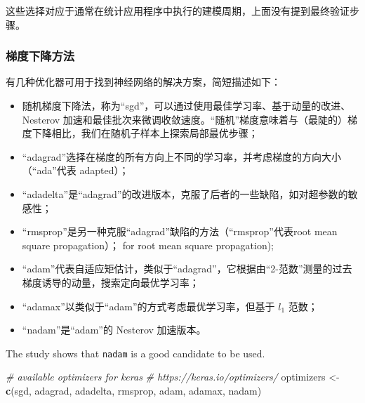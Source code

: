 \documentclass[
]{article}
\newenvironment{Shaded}{\begin{snugshade}}{\end{snugshade}}
\newcommand{\CommentTok}[1]{\textcolor[rgb]{0.56,0.35,0.01}{\textit{#1}}}
\newcommand{\FunctionTok}[1]{\textcolor[rgb]{0.13,0.29,0.53}{\textbf{#1}}}
\newcommand{\NormalTok}[1]{#1}
\newcommand{\OtherTok}[1]{\textcolor[rgb]{0.56,0.35,0.01}{#1}}
\newcommand{\StringTok}[1]{\textcolor[rgb]{0.31,0.60,0.02}{#1}}
\providecommand{\tightlist}{%
  \setlength{\itemsep}{0pt}\setlength{\parskip}{0pt}}
\begin{document}
这些选择对应于通常在统计应用程序中执行的建模周期，上面没有提到最终验证步骤。

\subsubsection{梯度下降方法}\label{ux68afux5ea6ux4e0bux964dux65b9ux6cd5}

有几种优化器可用于找到神经网络的解决方案，简短描述如下：

\begin{itemize}
\tightlist
\item
  随机梯度下降法，称为``sgd''，可以通过使用最佳学习率、基于动量的改进、Nesterov
  加速和最佳批次来微调收敛速度。``随机''梯度意味着与（最陡的）梯度下降相比，我们在随机子样本上探索局部最优步骤；
\item
  ``adagrad''选择在梯度的所有方向上不同的学习率，并考虑梯度的方向大小（``ada''代表
  adapted）；
\item
  ``adadelta''是``adagrad''的改进版本，克服了后者的一些缺陷，如对超参数的敏感性；
\item
  ``rmsprop''是另一种克服``adagrad''缺陷的方法（``rmsprop''代表root mean
  square propagation）； for root mean square propagation);
\item
  ``adam''代表自适应矩估计，类似于``adagrad''，它根据由``2-范数''测量的过去梯度诱导的动量，搜索定向最优学习率；
\item
  ``adamax''以类似于``adam''的方式考虑最优学习率，但基于 \(l_1\) 范数；
\item
  ``nadam''是``adam''的 Nesterov 加速版本。
\end{itemize}

The study shows that \texttt{nadam} is a good candidate to be used.

\begin{Shaded}
\begin{Highlighting}[]
\CommentTok{\# available optimizers for keras}
\CommentTok{\# https://keras.io/optimizers/}
\NormalTok{optimizers }\OtherTok{\textless{}{-}} \FunctionTok{c}\NormalTok{(}\StringTok{\textquotesingle{}sgd\textquotesingle{}}\NormalTok{, }\StringTok{\textquotesingle{}adagrad\textquotesingle{}}\NormalTok{, }\StringTok{\textquotesingle{}adadelta\textquotesingle{}}\NormalTok{, }\StringTok{\textquotesingle{}rmsprop\textquotesingle{}}\NormalTok{, }\StringTok{\textquotesingle{}adam\textquotesingle{}}\NormalTok{, }\StringTok{\textquotesingle{}adamax\textquotesingle{}}\NormalTok{, }\StringTok{\textquotesingle{}nadam\textquotesingle{}}\NormalTok{)}
\end{Highlighting}
\end{Shaded}
\end{document}
